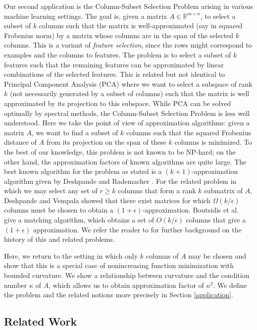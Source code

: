 \documentclass{article}
\newcommand{\reals}{\ensuremath{\mathbb{R}}}
\theoremstyle{definition}
\begin{document}
Our second application is the Column-Subset Selection Problem  arising in various machine learning settings. The goal is, given a matrix $A \in \reals^{m \times n}$, to select a subset of $k$ columns such that the matrix is well-approximated (say in squared Frobenius norm) by a matrix whose columns are in the span of the selected $k$ columns. This is a variant of {\em feature selection}, since the rows might correspond to examples and the columns to features. The problem is to select a subset of $k$ features such that the remaining features can be approximated by linear combinations of the selected features. This is related but not identical to Principal Component Analysis (PCA) where we want to select a subspace of rank $k$ (not necessarily generated by a subset of columns) such that the matrix is well approximated by its projection to this subspace. While PCA can be solved optimally by spectral methods, the Column-Subset Selection Problem is less well understood. Here we take the point of view of approximation algorithms: given a matrix $A$, we want to find a subset of $k$ columns such that the squared Frobenius distance of $A$ from its projection on the span of these $k$ columns is minimized.  To the best of our knowledge, this problem is not known to be NP-hard; on the other hand, the approximation factors of known algorithms are quite large.   The best known algorithm for the problem as stated is a $(k+1)$-approximation algorithm given by Deshpande and Rademacher \cite{Deshpande2010}.  For the related problem in which we may select any set of $r \ge k$ columns that form a rank $k$ submatrix of $A$, Deshpande and Vempala \cite{Deshpande2006} showed that there exist matrices for which $\Omega(k/\epsilon)$ columns must be chosen to obtain a $(1 + \epsilon)$-approximation.  Boutsidis et al.\ \cite{Boutsidis2014} give a matching algorithm, which obtains a set of $O(k/\epsilon)$ columns that give a $(1 + \epsilon)$ approximation.  We refer the reader to \cite{Boutsidis2014} for further background on the history of this and related problems.  

Here, we return to the setting in which only $k$ columns of $A$ may be chosen and show that this is a special case of nonincreasing function minimization with bounded curvature.  We show a relationship between curvature and the condition number $\kappa$ of $A$, which allows us to obtain approximation factor of $\kappa^2$. We define the problem and the related notions more precisely in Section \ref{application}.

\subsection{Related Work}
\label{sec:related-work}
\end{document}
